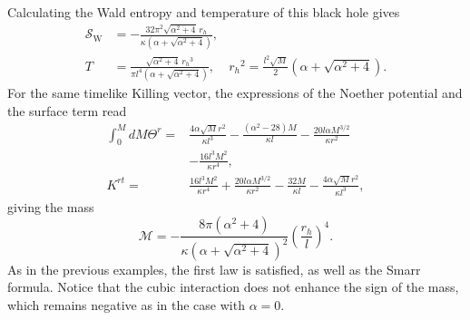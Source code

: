 \documentclass[prd,twocolumn,superscriptaddress,amsmath,amssymb,nofootinbib]{revtex4-1}
\begin{document}
Calculating the Wald entropy and temperature of this black hole
gives
\begin{align}
\mathcal{S}_{\mathrm{W}}&=-\frac{32\pi^2\sqrt{\alpha^2+4}\,r_h}
{\kappa\left(\alpha+\sqrt{\alpha^2+4}\right)},\label{entropysoln3}\\
T&=\frac{\sqrt{\alpha^2+4}\,{r_h}^3}
{{\pi}l^4\left(\alpha+\sqrt{\alpha^2+4}\right)},
& {r_h}^2 = \frac{l^2\sqrt{M}}2\left(\alpha+\sqrt{\alpha^2+4}\right).
\label{temsoln3}
\end{align}
For the same timelike Killing vector, the expressions of  the
Noether potential and the surface term read %
\begin{align*}
\int_{0}^{M}\!\!\!\!dM\Theta^{r}={}&\frac{4\alpha\sqrt{M}r^2}{{\kappa}l^3}
-\frac{(\alpha^2-28)M}{{\kappa}l}
-\frac{20l\alpha{M}^{3/2}}{\kappa{r}^{2}}\\
&-\frac{16{l}^{3}{M}^{2}}{\kappa{r}^{4}},\\
K^{rt}={}&\frac{16{l}^{3}{M}^{2}}{\kappa{r}^{4}}
+\frac{20l\alpha{M}^{3/2}}{\kappa{r}^{2}}
-\frac{32M}{{\kappa}l}
-\frac{4\alpha\sqrt{M}{r}^{2}}{\kappa{l}^{3}},
\end{align*}%
giving the mass
\begin{equation}\label{masssoln3}
\mathcal{M}=-\frac{8\pi(\alpha^2+4)}
{\kappa\left(\alpha+\sqrt{\alpha^2+4}\right)^2}\left(\frac{r_h}{l}\right)^4.
\end{equation}
As in the previous examples, the first law is satisfied, as well
as the Smarr formula. Notice that the cubic interaction does
not enhance the sign of the mass, which remains negative as in
the  case with $\alpha=0$.
\end{document}
